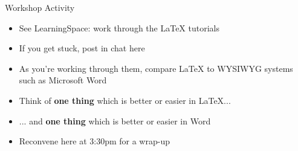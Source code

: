 \begin{frame}{Workshop Activity}
	\begin{itemize}
		\pause\item See LearningSpace: work through the LaTeX tutorials
		\pause\item If you get stuck, post in chat here
		\pause\item As you're working through them, compare LaTeX to WYSIWYG systems such as Microsoft Word
		\pause\item Think of \textbf{one thing} which is better or easier in LaTeX...
		\pause\item ... and \textbf{one thing} which is better or easier in Word
		\pause\item Reconvene here at 3:30pm for a wrap-up
    \end{itemize}
\end{frame}


